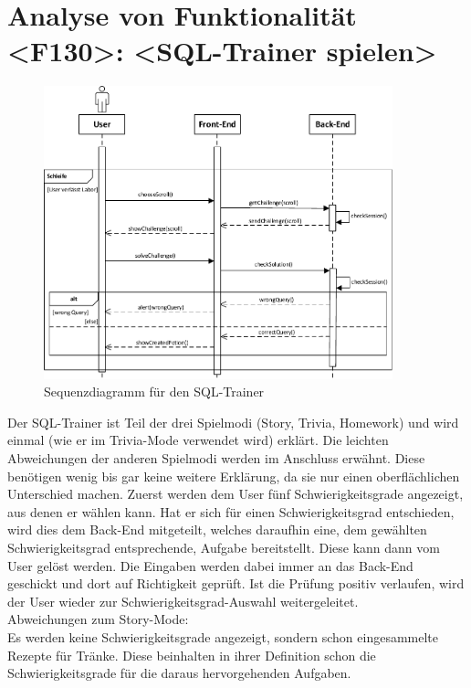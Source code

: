 \section{Analyse von Funktionalität <F130>: <SQL-Trainer spielen>}
\begin{figure}[h]
\centering
\includegraphics[width=0.9\textwidth]{figures/sequenz_F130.pdf}
\caption{Sequenzdiagramm für den SQL-Trainer}
\label{sequence_f130}
\end{figure}

Der SQL-Trainer ist Teil der drei Spielmodi (Story, Trivia, Homework) und wird einmal (wie er im Trivia-Mode verwendet wird) erklärt. Die leichten Abweichungen der anderen Spielmodi werden im Anschluss erwähnt. Diese benötigen wenig bis gar keine weitere Erklärung, da sie nur einen oberflächlichen Unterschied machen.
Zuerst werden dem User f\"unf Schwierigkeitsgrade angezeigt, aus denen er wählen kann. Hat er sich für einen Schwierigkeitsgrad entschieden, wird dies dem Back-End mitgeteilt, welches daraufhin eine, dem gewählten Schwierigkeitsgrad entsprechende, Aufgabe bereitstellt. Diese kann dann vom User gelöst werden. Die Eingaben werden dabei immer an das Back-End geschickt und dort auf Richtigkeit geprüft. 
Ist die Prüfung positiv verlaufen, wird der User wieder zur Schwierigkeitsgrad-Auswahl weitergeleitet.\\
\newpage
Abweichungen zum Story-Mode:\\
Es werden keine Schwierigkeitsgrade angezeigt, sondern schon eingesammelte Rezepte für Tränke. Diese beinhalten in ihrer Definition schon die Schwierigkeitsgrade für die daraus hervorgehenden Aufgaben.


